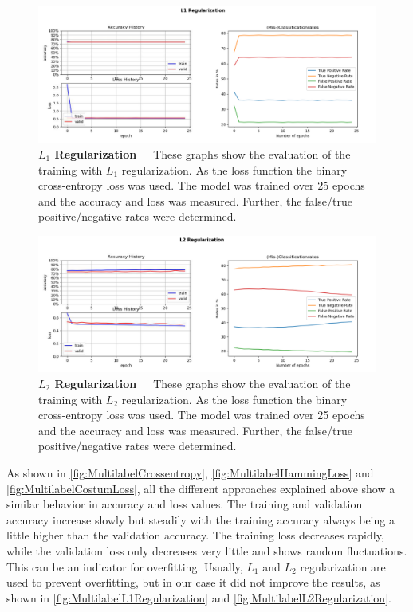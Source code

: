 \begin{figure}[!htb]
	\centering
	\includegraphics[scale=0.37]{Figures/chapter04/multilabel_L1.png}
	\decoRule
	\caption[Multi-Label \(L_1\) Regularization]{\textbf{\(L_1\) Regularization}~~~These graphs show the evaluation of the training with \(L_1\) regularization. As the loss function the binary cross-entropy loss was used. The model was trained over 25 epochs and the accuracy and loss was measured. Further, the false/true positive/negative rates were determined.}
	\label{fig:MultilabelL1Regularization}
\end{figure}

\begin{figure}[!htb]
	\centering
	\includegraphics[scale=0.37]{Figures/chapter04/multilabel_L2.png}
	\decoRule
	\caption[Multi-Label \(L_2\) Regularization]{\textbf{\(L_2\) Regularization}~~~These graphs show the evaluation of the training with \(L_2\) regularization. As the loss function the binary cross-entropy loss was used. The model was trained over 25 epochs and the accuracy and loss was measured. Further, the false/true positive/negative rates were determined.}
	\label{fig:MultilabelL2Regularization}
\end{figure}

As shown in \autoref{fig:MultilabelCrossentropy}, \autoref{fig:MultilabelHammingLoss} and \autoref{fig:MultilabelCostumLoss}, all the different approaches explained above show a similar behavior in accuracy and loss values. The training and validation accuracy increase slowly but steadily with the training accuracy always being a little higher than the validation accuracy. The training loss decreases rapidly, while the validation loss only decreases very little and shows random fluctuations. This can be an indicator for overfitting. Usually, \(L_1\) and \(L_2\) regularization are used to prevent overfitting, but in our case it did not improve the results, as shown in \autoref{fig:MultilabelL1Regularization} and \autoref{fig:MultilabelL2Regularization}.

